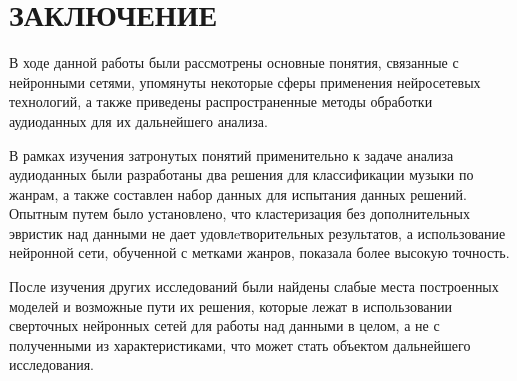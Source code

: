 \chapter*{ \large ЗАКЛЮЧЕНИЕ}
В ходе данной работы были рассмотрены основные понятия, связанные с нейронными сетями, упомянуты некоторые сферы 
применения нейросетевых технологий, а также приведены распространенные методы обработки аудиоданных для их дальнейшего анализа.

В рамках изучения затронутых понятий применительно к задаче анализа аудиоданных были разработаны два решения для классификации музыки по жанрам, а также составлен набор данных для испытания данных решений. Опытным путем было установлено, что кластеризация без дополнительных эвристик над данными не дает
удовлeтворительных результатов, а использование нейронной сети, обученной с метками жанров, показала более высокую точность.

После изучения других исследований были найдены слабые места построенных моделей и возможные пути их решения, которые лежат в использовании сверточных нейронных сетей
для работы над данными в целом, а не с полученными из характеристиками, что может стать объектом дальнейшего исследования.